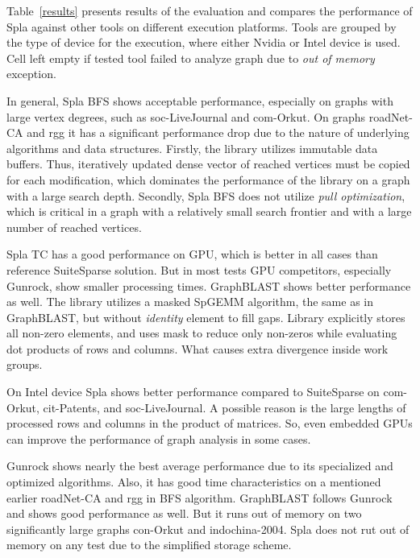 Table~\ref{results} presents results of the evaluation and compares the performance of Spla against other tools on different execution platforms.
Tools are grouped by the type of device for the execution, where either Nvidia or Intel device is used. 
Cell left empty if tested tool failed to analyze graph due to \textit{out of memory} exception.

In general, Spla BFS shows acceptable performance, especially on graphs with large vertex degrees, such as soc-LiveJournal and com-Orkut.
On graphs roadNet-CA and rgg it has a significant performance drop due to the nature of underlying algorithms and data structures. 
Firstly, the library utilizes immutable data buffers. Thus, iteratively updated dense vector of reached vertices must be copied for each modification, which dominates the performance of the library on a graph with a large search depth. 
Secondly, Spla BFS does not utilize \textit{pull optimization}, which is critical in a graph with a relatively small search frontier and with a large number of reached vertices. 

Spla TC has a good performance on GPU, which is better in all cases than reference SuiteSparse solution. 
But in most tests GPU competitors, especially Gunrock, show smaller processing times. 
GraphBLAST shows better performance as well. 
The library utilizes a masked SpGEMM algorithm, the same as in GraphBLAST, but without \textit{identity} element to fill gaps. 
Library explicitly stores all non-zero elements, and uses mask to reduce only non-zeros while evaluating dot products of rows and columns. 
What causes extra divergence inside work groups. 

On Intel device Spla shows better performance compared to SuiteSparse on com-Orkut, cit-Patents, and soc-LiveJournal. 
A possible reason is the large lengths of processed rows and columns in the product of matrices.
So, even embedded GPUs can improve the performance of graph analysis in some cases. 

Gunrock shows nearly the best average performance due to its specialized and optimized algorithms.
Also, it has good time characteristics on a mentioned earlier roadNet-CA and rgg in BFS algorithm. 
GraphBLAST follows Gunrock and shows good performance as well. 
But it runs out of memory on two significantly large graphs con-Orkut and indochina-2004. 
Spla does not rut out of memory on any test due to the simplified storage scheme.

